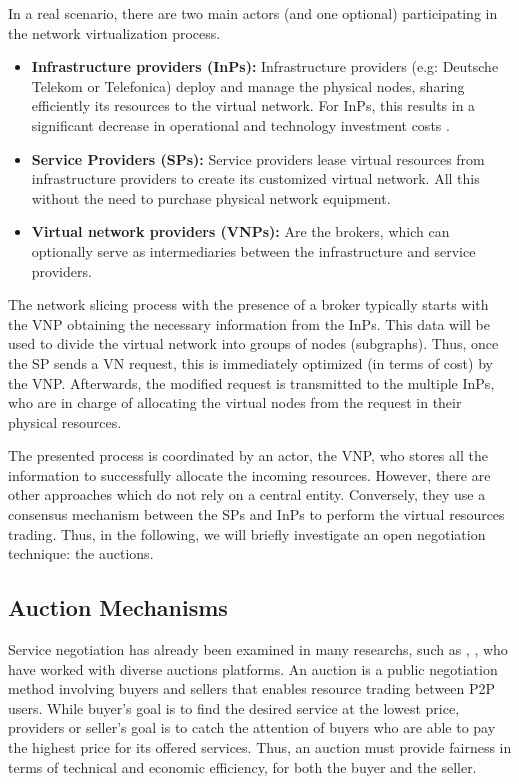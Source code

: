 In a real scenario, there are two main actors (and one optional) participating in the network virtualization process.

\begin{itemize}
	
	\item \textbf{Infrastructure providers (InPs):} Infrastructure providers (e.g: Deutsche Telekom or Telefonica) deploy and manage the physical nodes, sharing efficiently its resources to the virtual network. For InPs, this results in a significant decrease in operational and technology investment costs \citep{dietrich2015multi}.
	\item \textbf{Service Providers (SPs):} Service providers lease virtual resources from infrastructure providers to create its customized virtual network. All this without the need to purchase physical network equipment.
		\item \textbf{Virtual network providers (VNPs):} Are the brokers, which can optionally serve as intermediaries between the infrastructure and service providers.
\end{itemize}

The network slicing process with the presence of a broker typically starts with the VNP obtaining the necessary information from the InPs. This data will be used to divide the virtual network into groups of nodes (subgraphs). Thus, once the SP sends a VN request, this is immediately optimized (in terms of cost) by the VNP. Afterwards, the modified request is transmitted to the multiple InPs, who are in charge of allocating the virtual nodes from the request in their physical resources. 

The presented process is coordinated by an actor, the VNP, who stores all the information to successfully allocate the incoming resources. However, there are other approaches which do not rely on a central entity. Conversely, they use a consensus mechanism between the SPs and InPs to perform the virtual resources trading. Thus, in the following, we will briefly investigate an open negotiation technique: the auctions.

\subsection{Auction Mechanisms} 

Service negotiation has already been examined in many researchs, such as \citep{hausheer2005peermart}, \cite{ogston2002peer}, who have worked with diverse auctions platforms. An auction is a public negotiation method involving buyers and sellers that enables resource trading between P2P users. While buyer's goal is to find the desired service at the lowest price, providers or seller's goal is to catch the attention of buyers who are able to pay the highest price for its offered services. Thus, an auction must provide fairness in terms of technical and economic efficiency, for both the buyer and the seller.

